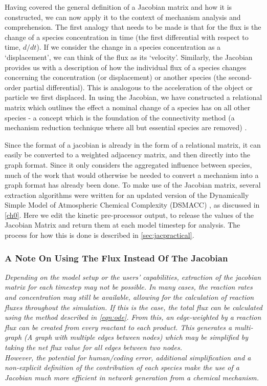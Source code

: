 Having covered the general definition of a Jacobian matrix and how it is constructed, we can now apply it to the context of mechanism analysis and comprehension. The first analogy that needs to be made is that for the flux is the change of a species concentration in time (the first differential with respect to time, $d/dt$). If we consider the change in a species concentration as a `displacement', we can think of the flux as its `velocity'.
Similarly, the Jacobian provides us with a description of how the individual flux of a species changes concerning the concentration (or displacement) or another species (the second-order partial differential). This is analogous to the acceleration of the object or particle we first displaced. In using the Jacobian, we have constructed a relational matrix which outlines the effect a nominal change of a species has on all other species - a concept which is the foundation of the connectivity method (a mechanism reduction technique where all but essential species are removed) \citep{connectivity}.

Since the format of a jacobian is already in the form of a relational matrix, it can easily be converted to a weighted adjacency matrix, and then directly into the graph format. Since it only considers the aggregated influence between species, much of the work that would otherwise be needed to convert a mechanism into a graph format has already been done. To make use of the Jacobian matrix, several extraction algorithms were written for an updated version of the Dynamically Simple Model of Atmospheric Chemical Complexity (DSMACC) \citep{dsmacc,dsmaccgit}, as discussed in \autoref{ch0}. Here we edit the kinetic pre-processor output, \citep{kpp} to release the values of the Jacobian Matrix and return them at each model timestep for analysis. The process for how this is done is described in \autoref{sec:jacpractical}.



\subsubsection*{ A Note On Using The Flux Instead Of The Jacobian }
\textit{
Depending on the model setup or the users' capabilities, extraction of the jacobian matrix for each timestep may not be possible. In many cases, the reaction rates and concentration may still be available, allowing for the calculation of reaction fluxes throughout the simulation. If this is the case, the total flux can be calculated using the method described in  \autoref{eqn:ode}. From this, an edge-weighted by a reaction flux can be created from every reactant to each product. This generates a multi-graph (A graph with multiple edges between nodes) which may be simplified by taking the net flux value for all edges between two nodes. \\
However, the potential for human/coding error, additional simplification and a non-explicit definition of the contribution of each species make the use of a Jacobian much more efficient in network generation from a chemical mechanism.
}

